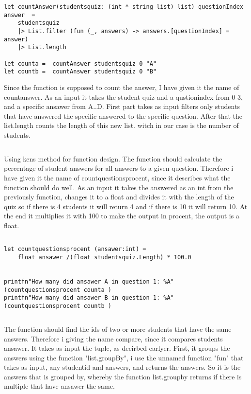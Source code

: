 \documentclass{article}
\begin{document}
 \begin{lstlisting}
let countAnswer(studentsquiz: (int * string list) list) questionIndex answer  = 
    studentsquiz
    |> List.filter (fun (_, answers) -> answers.[questionIndex] = answer)
    |> List.length 

let counta =  countAnswer studentsquiz 0 "A"
let countb =  countAnswer studentsquiz 0 "B"

    \end{lstlisting}

Since the function is supposed to count the answer, I have given it the name of countanswer. As an input it takes the student quiz and a qustionindex from 0-3, and a specific ansawer from A..D. First part takes as input  filters only students that have answered the specific answered to the specific question. After that the list.length counts the length of this new list. witch in our case is the number of students.

\subsection{}

Using kens method for function design. The function should calculate the percentage of student answers for all answers to a given question. Therefore i have given it the name of countquestionsprocent, since it describes what the function should do well. As an input it takes the answered as an int from the previously function, changes it to a float and divides it with the length of the quiz so if there is 4 students it will return 4 and if there is 10 it will return 10. At the end it multiplies it with 100 to make the output in procent, the output is a float.


 \begin{lstlisting}

let countquestionsprocent (ansawer:int) = 
    float ansawer /(float studentsquiz.Length) * 100.0 


printfn"How many did ansawer A in question 1: %A" (countquestionsprocent counta )
printfn"How many did ansawer B in question 1: %A" (countquestionsprocent countb )

    \end{lstlisting}


\subsection{}

The function should find the ids of two or more students that have the same answers. Therefore i giving the name compare, since it compares students ansawer. It takes as input the tuple, as decirbed earlyer. First, it groups the answers using the function "list.groupBy", i use the unnamed function "fun" that takes as input, any studentid and answers, and returns the answers. So it is the answers that is grouped by, whereby the function list.groupby returns if there is multiple that have ansawer the same. 
\end{document}
